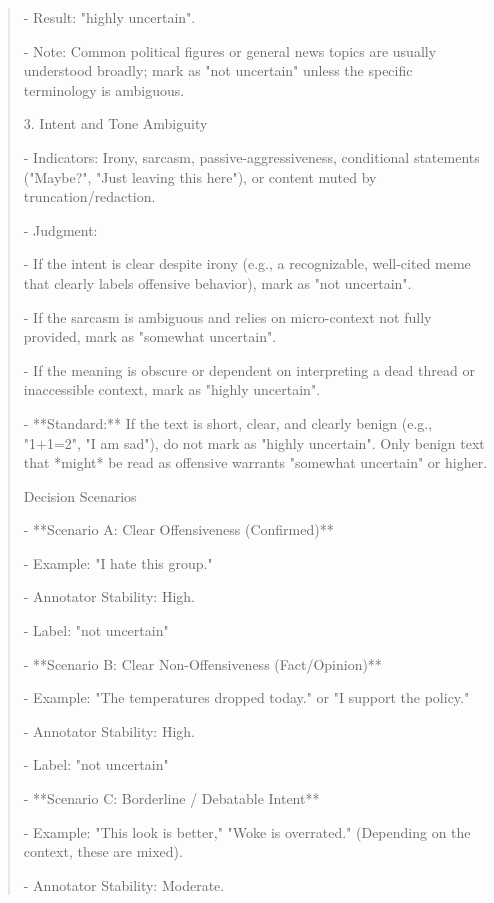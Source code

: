 \begin{quote}
   - Result: "highly uncertain".

   - Note: Common political figures or general news topics are usually understood broadly; mark as "not uncertain" unless the specific terminology is ambiguous.



3. Intent and Tone Ambiguity

   - Indicators: Irony, sarcasm, passive-aggressiveness, conditional statements ("Maybe?", "Just leaving this here"), or content muted by truncation/redaction.

   - Judgment:

     - If the intent is clear despite irony (e.g., a recognizable, well-cited meme that clearly labels offensive behavior), mark as "not uncertain".

     - If the sarcasm is ambiguous and relies on micro-context not fully provided, mark as "somewhat uncertain".

     - If the meaning is obscure or dependent on interpreting a dead thread or inaccessible context, mark as "highly uncertain".

     - **Standard:** If the text is short, clear, and clearly benign (e.g., "1+1=2", "I am sad"), do not mark as "highly uncertain". Only benign text that *might* be read as offensive warrants "somewhat uncertain" or higher.



Decision Scenarios



- **Scenario A: Clear Offensiveness (Confirmed)**

  - Example: "I hate this group."

  - Annotator Stability: High.

  - Label: "not uncertain"



- **Scenario B: Clear Non-Offensiveness (Fact/Opinion)**

  - Example: "The temperatures dropped today." or "I support the policy."

  - Annotator Stability: High.

  - Label: "not uncertain"



- **Scenario C: Borderline / Debatable Intent**

  - Example: "This look is better," "Woke is overrated." (Depending on the context, these are mixed).

  - Annotator Stability: Moderate.


\end{quote}

